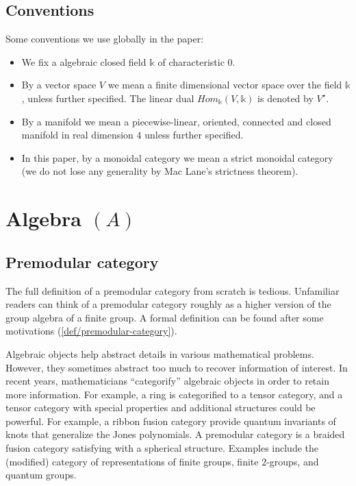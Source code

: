 \subsection{Conventions}

\noindent Some conventions we use globally in the paper:

\begin{itemize}
  \item We fix a algebraic closed field $\mathbb{k}$ of
        characteristic $0$.
  \item By a vector space $V$ we mean a finite dimensional vector
        space over the field $\mathbb{k}$, unless further
        specified. The linear dual
        $Hom_{\mathbb{k}}(V,\mathbb{k})$ is denoted by
        $V^{\star}$.
  \item By a manifold we mean a piecewise-linear, oriented,
        connected and closed manifold in real dimension $4$
        unless further specified.
  \item In this paper, by a monoidal category we mean a strict
        monoidal category (we do not lose any generality by Mac
        Lane's strictness theorem). 
\end{itemize}

\section{Algebra $(A)$}\label{section/algebra}
\subsection{Premodular category}

The full definition of a premodular category from scratch is
tedious. Unfamiliar readers can think of a premodular category
roughly as a higher version of the group algebra of a finite
group. A formal definition can be found after some motivations
(\ref{def/premodular-category}).

Algebraic objects help abstract details in various mathematical
problems. However, they sometimes abstract too much to recover
information of interest. In recent years, mathematicians
``categorify'' algebraic objects in order to retain more
information. For example, a ring is categorified to a tensor
category, and a tensor category with special properties and
additional structures could be powerful. For example, a ribbon
fusion category provide quantum invariants of knots that
generalize the Jones polynomials. A premodular category is a
braided fusion category satisfying with a spherical structure.
Examples include the (modified) category of representations of
finite groups, finite $2$-groups, and quantum groups.

